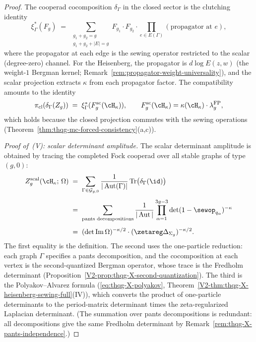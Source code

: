 \begin{proof}
The cooperad cocomposition $\delta_\Gamma$ in the closed sector is
the clutching identity
\begin{equation}\label{eq:heisenberg-clutching-closed}
\xi^*_\Gamma(F_g)
\;=\;
\sum_{\substack{g_1 + g_2 = g \\ g_1 + g_2 + |E| = g}}
F_{g_1} \cdot F_{g_2} \cdot \prod_{e \in E(\Gamma)}
(\text{propagator at } e),
\end{equation}
where the propagator at each edge is the sewing operator restricted
to the scalar (degree-zero) channel. For the Heisenberg, the
propagator is $d\log E(z,w)$ (the weight-$1$ Bergman kernel;
Remark~\ref{rem:propagator-weight-universality}), and the scalar
projection extracts $\kappa$ from each propagator factor. The
compatibility amounts to the identity
\[
\pi_{\mathrm{cl}}(\delta_\Gamma(Z_g))
\;=\;
\xi^*_\Gamma(F_g^{\mathrm{sc}}(\cH_\kappa)),
\qquad
F_g^{\mathrm{sc}}(\cH_\kappa)
=\kappa(\cH_\kappa) \cdot \lambda_g^{\mathrm{FP}},
\]
which holds because the closed projection commutes with the sewing
operations (Theorem~\ref{thm:thqg-mc-forced-consistency}(a,c)).

\medskip\noindent
\textit{Proof of~\textup{(V)}: scalar determinant amplitude.}
The scalar determinant amplitude is obtained by tracing the completed
Fock cooperad over all stable graphs of type $(g,0)$:
\begin{align*}
Z_g^{\mathrm{scal}}(\cH_\kappa;\,\Omega)
&\;=\;
\sum_{\Gamma \in \mathcal{G}_{g,0}}
\frac{1}{|\operatorname{Aut}(\Gamma)|}
\operatorname{Tr}\bigl(\delta_\Gamma(\id)\bigr)
\\[4pt]
&\;=\;
\sum_{\text{pants decompositions}}
\frac{1}{|\operatorname{Aut}|}
\prod_{\alpha=1}^{3g-3}
\det(1 - \sewop_{q_\alpha})^{-\kappa}
\\[4pt]
&\;=\;
(\det\operatorname{Im}\Omega)^{-\kappa/2}
\cdot (\zetareg\Delta_{\Sigma_g})^{-\kappa/2}.
\end{align*}
The first equality is the definition. The second uses the
one-particle reduction: each graph $\Gamma$ specifies a pants
decomposition, and the cocomposition at each vertex is the
second-quantized Bergman operator, whose trace is the Fredholm
determinant (Proposition~\ref{V2-prop:thqg-X-second-quantization}).
The third is the Polyakov--Alvarez formula
(\eqref{eq:thqg-X-polyakov}, Theorem~\ref{V2-thm:thqg-X-heisenberg-sewing-full}(IV)),
which converts the product of one-particle determinants to
the period-matrix determinant times the zeta-regularized
Laplacian determinant. (The summation over pants decompositions
is redundant: all decompositions give the same Fredholm
determinant by
Remark~\ref{rem:thqg-X-pants-independence}.)


\end{proof}
